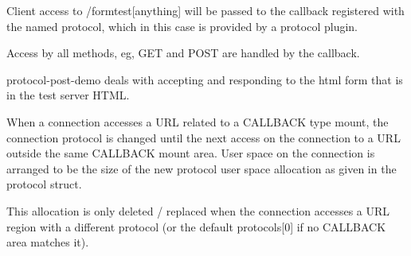 Client access to /formtest\mbox{[}anything\mbox{]} will be passed to the callback registered with the named protocol, which in this case is provided by a protocol plugin.

Access by all methods, eg, G\+ET and P\+O\+ST are handled by the callback.

protocol-\/post-\/demo deals with accepting and responding to the html form that is in the test server H\+T\+ML.

When a connection accesses a U\+RL related to a C\+A\+L\+L\+B\+A\+CK type mount, the connection protocol is changed until the next access on the connection to a U\+RL outside the same C\+A\+L\+L\+B\+A\+CK mount area. User space on the connection is arranged to be the size of the new protocol user space allocation as given in the protocol struct.

This allocation is only deleted / replaced when the connection accesses a U\+RL region with a different protocol (or the default protocols\mbox{[}0\mbox{]} if no C\+A\+L\+L\+B\+A\+CK area matches it). 